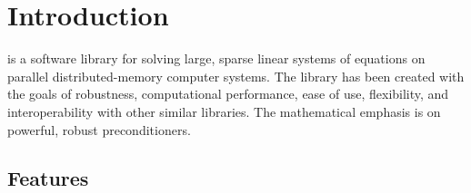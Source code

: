 \chapter{Introduction}
\label{Introduction}

\hypre{} is a software library for solving large, sparse linear
systems of equations on parallel distributed-memory computer
systems. The library has been created with the goals of robustness,
computational performance, ease of use, flexibility, and interoperability
with other similar libraries. The mathematical emphasis is on
powerful, robust preconditioners.


\section{Features}

